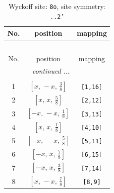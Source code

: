 \documentclass[fleqn,8pt]{jsarticle}
\begin{document}
\begin{longtable}{ccc}
\caption{Wyckoff site: {\tt 8o}, site symmetry: {\tt ..2'}}
 \\
 \hline \hline
No. & position & mapping \\ \hline \endfirsthead

\multicolumn{2}{l}{\tablename\ \thetable{}} \\
 \hline \hline
No. & position & mapping \\ \hline \endhead

 \hline \hline
\multicolumn{2}{r}{\footnotesize\it continued ...} \\ \endfoot

 \hline \hline
\multicolumn{2}{r}{} \\ \endlastfoot

1 & $\left[ x,\, - x,\, \frac{3}{8} \right]$ & {\tt [1,16]} \\ \hline
2 & $\left[ x,\, x,\, \frac{5}{8} \right]$ & {\tt [2,12]} \\ \hline
3 & $\left[ - x,\, - x,\, \frac{1}{8} \right]$ & {\tt [3,13]} \\ \hline
4 & $\left[ x,\, x,\, \frac{1}{8} \right]$ & {\tt [4,10]} \\ \hline
5 & $\left[ - x,\, - x,\, \frac{5}{8} \right]$ & {\tt [5,11]} \\ \hline
6 & $\left[ - x,\, x,\, \frac{7}{8} \right]$ & {\tt [6,15]} \\ \hline
7 & $\left[ - x,\, x,\, \frac{3}{8} \right]$ & {\tt [7,14]} \\ \hline
8 & $\left[ x,\, - x,\, \frac{7}{8} \right]$ & {\tt [8,9]} \\
\end{longtable}
\renewcommand{\arraystretch}{1.2}
\end{document}
